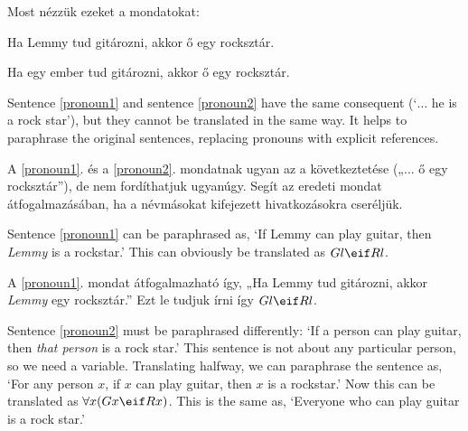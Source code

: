 Most nézzük ezeket a mondatokat:

\begin{earg}
\item[\ex{pronoun1}] Ha Lemmy tud gitározni, akkor ő egy rocksztár.
\item[\ex{pronoun2}] Ha egy ember tud gitározni, akkor ő egy rocksztár.
\end{earg}

Sentence \ref{pronoun1} and sentence \ref{pronoun2} have the same consequent (`$\ldots$ he is a rock star'), but they cannot be translated in the same way. It helps to paraphrase the original sentences, replacing pronouns with explicit references.

A \ref{pronoun1}. és a \ref{pronoun2}. mondatnak ugyan az a következtetése („$\ldots$ ő egy rocksztár”), de nem fordíthatjuk ugyanúgy. Segít az eredeti mondat átfogalmazásában, ha a névmásokat kifejezett hivatkozásokra cseréljük.

Sentence \ref{pronoun1} can be paraphrased as, `If Lemmy can play guitar, then \emph{Lemmy} is a rockstar.' This can obviously be translated as $Gl \eif Rl$.

A \ref{pronoun1}. mondat átfogalmazható így, „Ha Lemmy tud gitározni, akkor \emph{Lemmy} egy rocksztár.” Ezt le tudjuk írni így $Gl \eif Rl$.






Sentence \ref{pronoun2} must be paraphrased differently: `If a person can play guitar, then \emph{that person} is a rock star.' This sentence is not about any particular person, so we need a variable. Translating halfway, we can paraphrase the sentence as, `For any person $x$, if $x$ can play guitar, then $x$ is a rockstar.' Now this can be translated as $\forall x (Gx \eif Rx)$. This is the same as, `Everyone who can play guitar is a rock star.'

